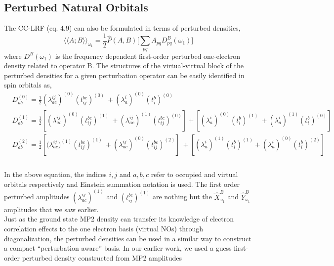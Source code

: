 \subsection{Perturbed Natural Orbitals}
The CC-LRF (eq. 4.9) can also be formulated in terms of perturbed densities,
\begin{equation}
{\langle\langle A;B\rangle\rangle}_{\omega_1} =  \frac{1}{2}\hat{P}(A,B)\big[\sum_{pq} A_{pq}D^{B}_{pq}(\omega_1)\big]
\end{equation}
where $D^{B}(\omega_1)$ is the frequency dependent first-order
perturbed one-electron density related to operator B. The structures  
of the virtual-virtual block of the perturbed densities for a given
perturbation operator can be easily identified in spin orbitals as,
\\
\begin{equation}
\begin{split}
& D^{(0)}_{ab} = \frac{1}{2}(\lambda^{ij}_{ac})^{(0)}(t^{bc}_{ij})^{(0)} \
+ (\lambda^{i}_{a})^{(0)}(t^{b}_{i})^{(0)} \\
&D^{(1)}_{ab} = \frac{1}{2}[(\lambda^{ij}_{ac})^{(0)}(t^{bc}_{ij})^{(1)} \
+ (\lambda^{ij}_{ac})^{(1)}(t^{bc}_{ij})^{(0)}] + [(\lambda^{i}_{a})^{(0)}(t^{b}_{i})^{(1)}\
 + (\lambda^{i}_{a})^{(1)}(t^{b}_{i})^{(0)}] \\
&D^{(2)}_{ab} = \frac{1}{2}[{(\lambda^{ij}_{ac}})^{(1)}(t^{bc}_{ij})^{(1)}\
 + (\lambda^{ij}_{ac})^{(0)}(t^{bc}_{ij})^{(2)}]\ 
+ [(\lambda^{i}_{a})^{(1)} (t^{b}_{i})^{(1)} + (\lambda^{i}_{a})^{(0)}(t^{b}_{i})^{(2)}]\\
\end{split}
\end{equation}
\\
In the above equation, the indices $i,j$ and $a,b,c$ refer to occupied and virtual orbitals respectively
and Einstein summation notation is used. The first order perturbed amplitudes $(\lambda^{ij}_{ac})^{(1)}$ 
and $(t^{bc}_{ij})^{(1)}$ are nothing but the $\hat{X}^{B}_{\omega_1}$ and $\hat{Y}^{B}_{\omega_1}$ 
amplitudes that we saw earlier.\\ Just as the ground state MP2 density can transfer its knowledge of 
electron correlation effects to the one electron basis (virtual NOs) through diagonalization, 
the perturbed densities can be used in a similar way to construct a compact ``perturbation aware''
basis. In our earlier work, we used a guess first-order perturbed density constructed from MP2 amplitudes
